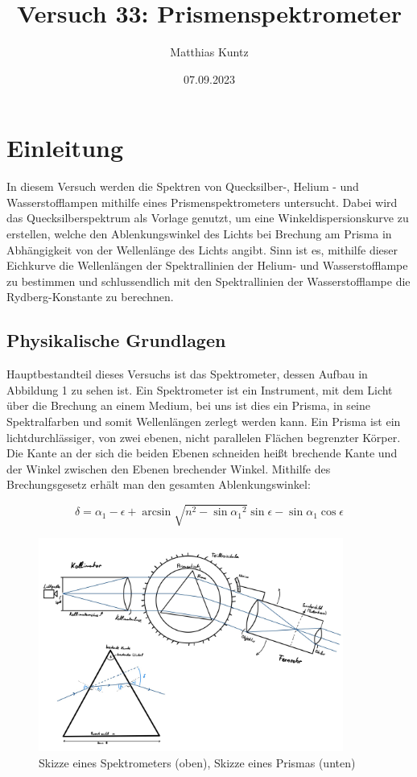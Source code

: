 \documentclass{article}
\title{Versuch 33: Prismenspektrometer}
\author{Matthias Kuntz}
\date{07.09.2023}
\begin{document}
\maketitle

\section{Einleitung}

In diesem Versuch werden die Spektren von Quecksilber-, Helium - und Wasserstofflampen mithilfe eines Prismenspektrometers untersucht. Dabei wird das Quecksilberspektrum als Vorlage genutzt, um eine Winkeldispersionskurve zu erstellen, welche den Ablenkungswinkel des Lichts bei Brechung am Prisma in Abhängigkeit von der Wellenlänge des Lichts angibt. Sinn ist es, mithilfe dieser Eichkurve die Wellenlängen der Spektrallinien der Helium- und Wasserstofflampe zu bestimmen und schlussendlich mit den Spektrallinien der Wasserstofflampe die Rydberg-Konstante zu berechnen.

\subsection{Physikalische Grundlagen}

Hauptbestandteil dieses Versuchs ist das Spektrometer, dessen Aufbau in Abbildung 1 zu sehen ist. Ein Spektrometer ist ein Instrument, mit dem Licht über die Brechung an einem Medium, bei uns ist dies ein Prisma, in seine Spektralfarben und somit Wellenlängen zerlegt werden kann. Ein Prisma ist ein lichtdurchlässiger, von zwei ebenen, nicht parallelen Flächen begrenzter Körper. Die Kante an der sich die beiden Ebenen schneiden heißt brechende Kante und der Winkel zwischen den Ebenen brechender Winkel. Mithilfe des Brechungsgesetz erhält man den gesamten Ablenkungswinkel:

\begin{equation}
    \delta = \alpha_1 - \epsilon + \arcsin{\sqrt{n^2 - \sin{\alpha_1}^2}\sin{\epsilon} - \sin{\alpha_1} \cos{\epsilon}}
\end{equation}

\begin{figure} [h]
\includegraphics[width=10cm]{graphics/abb1.jpg} 
\caption{Skizze eines Spektrometers (oben), Skizze eines Prismas (unten)}
\end{figure}
\end{document}
